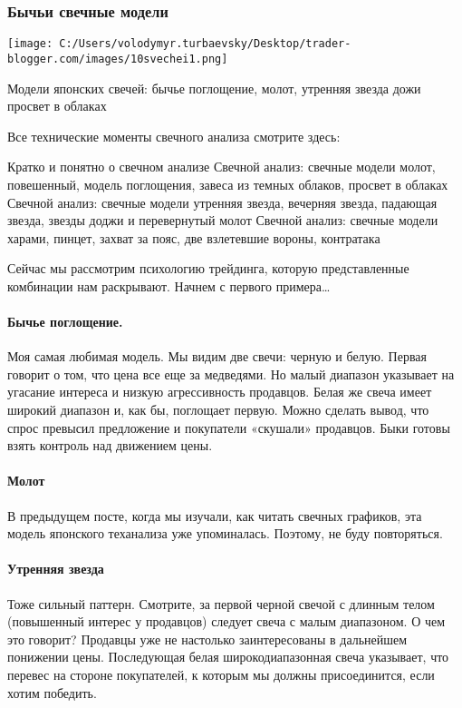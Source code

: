 \documentclass[a5paper]{article}
\begin{document}
\subsubsection{Бычьи свечные модели}

\texttt{[image: C:/Users/volodymyr.turbaevsky/Desktop/trader-blogger.com/images/10svechei1.png]}

Модели японских свечей: бычье поглощение, молот, утренняя звезда дожи просвет в облаках

Все технические моменты свечного анализа смотрите здесь:

    Кратко и понятно о свечном анализе
    Свечной анализ: свечные модели молот, повешенный, модель поглощения, завеса из темных облаков, просвет в облаках
    Свечной анализ: свечные модели утренняя звезда, вечерняя звезда, падающая звезда, звезды доджи и перевернутый молот
    Свечной анализ: свечные модели харами, пинцет, захват за пояс, две взлетевшие вороны, контратака

Сейчас мы рассмотрим психологию трейдинга, которую представленные
комбинации нам раскрывают. Начнем с первого примера…

\paragraph{Бычье поглощение.}

Моя самая любимая модель. Мы видим две свечи: черную и белую. Первая
говорит о том, что цена все еще за медведями. Но малый диапазон
указывает на угасание интереса и низкую агрессивность продавцов. Белая
же свеча имеет широкий диапазон и, как бы, поглощает первую. Можно
сделать вывод, что спрос превысил предложение и покупатели «скушали»
продавцов. Быки готовы взять контроль над движением цены.

\paragraph{Молот}

В предыдущем посте, когда мы изучали, как читать свечных графиков, эта
модель японского теханализа уже упоминалась. Поэтому, не буду
повторяться.

\paragraph{Утренняя звезда}

Тоже сильный паттерн. Смотрите, за первой черной свечой с длинным
телом (повышенный интерес у продавцов) следует свеча с малым
диапазоном. О чем это говорит? Продавцы уже не настолько
заинтересованы в дальнейшем понижении цены. Последующая белая
широкодиапазонная свеча указывает, что перевес на стороне покупателей,
к которым мы должны присоединится, если хотим победить.
\end{document}
